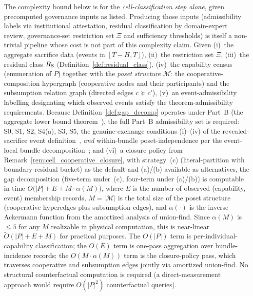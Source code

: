 \begin{proposition}
\label{prop:gap_computable}
The complexity bound below is for the
\emph{cell-classification step alone}, given precomputed
governance inputs as listed.  Producing those inputs
(admissibility labels via institutional attestation,
residual classification by domain-expert review,
governance-set restriction set $\Xi$ and sufficiency
thresholds) is itself a non-trivial pipeline whose cost is
not part of this complexity claim.
Given
(i)~the aggregate sacrifice data (events in $[T - H, T]$),
(ii)~the restriction set $\Xi$,
(iii)~the residual class $R_{\mathrm{S}}$
(Definition~\ref{def:residual_class}),
(iv)~the capability census (enumeration of $P$) together with
the \emph{poset structure} $\mathcal{M}$: the
cooperative-composition hypergraph (cooperative nodes and their
participants) and the subsumption relation graph (directed
edges $c \succeq c'$),
(v)~an event-admissibility labelling designating which observed
events satisfy the theorem-admissibility requirements.  Because
Definition~\ref{def:gap_decomp} operates under Part~B
(the aggregate lower bound theorem~\citep[Revealed~Sacrifice]{lasser2026paper8a}), the full Part~B
admissibility set is required: S0, S1, S2, S4(a), S3, S5, the
genuine-exchange conditions (i)--(iv) of
the revealed-sacrifice event definition~\citep[Revealed~Sacrifice]{lasser2026paper8a}, \emph{and} within-bundle
poset-independence per the event-local bundle decomposition~\citep[Revealed~Sacrifice]{lasser2026paper8a}; and
(vi)~a closure policy from
Remark~\ref{rem:cell_cooperative_closure}, with strategy~(c)
(literal-partition with boundary-residual bucket) as the
default and (a)/(b) available as alternatives,
the gap decomposition (five-term under~(c), four-term under
(a)/(b)) is computable in time
$O\bigl(|P| + E + M \cdot \alpha(M)\bigr)$, where $E$ is the
number of observed (capability, event) membership records,
$M = |\mathcal{M}|$ is the total size of the poset structure
(cooperative hyperedges plus subsumption edges), and
$\alpha(\cdot)$ is the inverse Ackermann function from the
amortized analysis of union-find.  Since $\alpha(M)$ is
$\leq 5$ for any $M$ realizable in physical computation, this
is near-linear $\widetilde{O}(|P| + E + M)$ for practical
purposes.  The $O(|P|)$ term is per-individual-capability
classification; the $O(E)$ term is one-pass aggregation over
bundle-incidence records; the $O(M \cdot \alpha(M))$ term is
the closure-policy pass, which traverses cooperative and
subsumption edges jointly via amortized union-find.
No structural counterfactual computation is required (a
direct-measurement approach would require $O(|P|^2)$
counterfactual queries).
\end{proposition}

